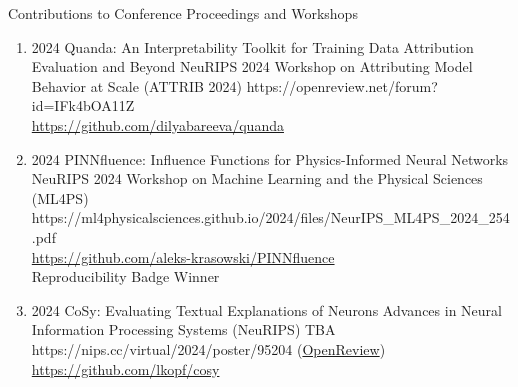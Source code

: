 \headedsubsection %
{Contributions to Conference Proceedings and Workshops}{}
{
    \begin{enumerate}
        
        \item {}
                    {2024}
                    {Quanda: An Interpretability Toolkit for Training Data Attribution Evaluation and Beyond}
                    {NeuRIPS 2024 Workshop on Attributing Model Behavior at Scale (ATTRIB 2024)}
                    {}
                    {https://openreview.net/forum?id=IFk4bOA11Z}
                    {
                    \\
                    \href{https://github.com/dilyabareeva/quanda}{https://github.com/dilyabareeva/quanda}
                    }


        \item {}
                        {2024}
                        {PINNfluence: Influence Functions for Physics-Informed Neural Networks}
                        {NeuRIPS 2024 Workshop on Machine Learning and the Physical Sciences (ML4PS)}
                        {}
                        {https://ml4physicalsciences.github.io/2024/files/NeurIPS_ML4PS_2024_254.pdf}
                        {\\\href{https://github.com/aleks-krasowski/PINNfluence}{https://github.com/aleks-krasowski/PINNfluence}\\
                        Reproducibility Badge Winner}


        \item {}
                        {2024}
                        {CoSy: Evaluating Textual Explanations of Neurons}
                        {Advances in Neural Information Processing Systems (NeuRIPS)}
                        {TBA}
                        {https://nips.cc/virtual/2024/poster/95204}
                        {(\href{https://openreview.net/forum?id=2g84EvFlRt}{OpenReview})\\
                        \href{https://github.com/lkopf/cosy}{https://github.com/lkopf/cosy}
                        }



\end{enumerate}}
